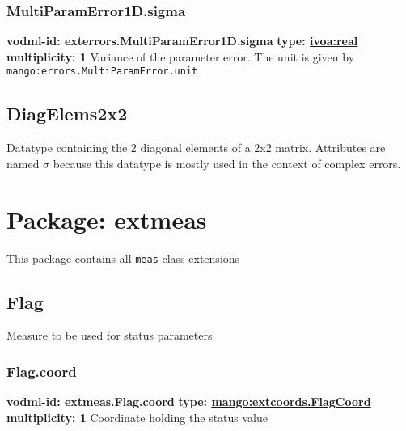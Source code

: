    \subsubsection{MultiParamError1D.sigma}
      \textbf{vodml-id: exterrors.MultiParamError1D.sigma} \newline
      \textbf{type: \hyperref[sect:ivoa]{ivoa:real}} \newline
      \textbf{multiplicity: 1} \newline 
      Variance of the parameter error. The unit is given by \texttt{mango:errors.MultiParamError.unit}

  \subsection{DiagElems2x2}
  \label{sect:exterrors.DiagElems2x2}
  Datatype containing the 2 diagonal elements of a 2x2 matrix. Attributes are named $\sigma$ because this datatype is mostly used in the context of complex errors.

\pagebreak
\section{Package: extmeas }


  This package contains all \texttt{meas} class extensions

  \subsection{Flag}
  \label{sect:extmeas.Flag}
    Measure to be used for status parameters

    \subsubsection{Flag.coord}
      \textbf{vodml-id: extmeas.Flag.coord} \newline
      \textbf{type: \hyperref[sect:extcoords.FlagCoord]{mango:extcoords.FlagCoord}} \newline
      \textbf{multiplicity: 1} \newline 
      Coordinate holding the status value


